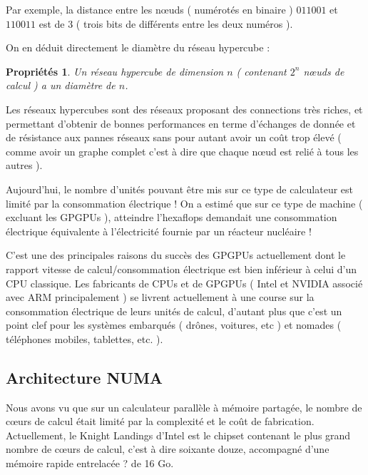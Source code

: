 \documentclass[fleqn,11pt]{article}
\newtheorem{prop}{Propriétés }
\begin{document}
\begin{itemize}
\begin{itemize}
Par exemple, la distance entre les nœuds ( numérotés en binaire ) $011001$ et $110011$ est de 3 ( trois bits
de différents entre les deux numéros ).

On en déduit directement le diamètre du réseau hypercube :

\begin{prop}
Un réseau hypercube de dimension $n$ ( contenant $2^{n}$ nœuds de calcul ) a un diamètre de $n$.
\end{prop}

Les réseaux hypercubes sont des réseaux proposant des connections très riches,
et permettant d'obtenir de bonnes performances en terme d'échanges de donnée
et de résistance aux pannes réseaux sans pour autant avoir un coût trop élevé 
( comme avoir un graphe complet c'est à dire que chaque nœud est relié à tous les autres ).

\end{itemize}



Aujourd'hui, le nombre d'unités pouvant être mis sur ce type de calculateur 
est limité par la consommation électrique !  
On a estimé que sur ce type de machine ( excluant les GPGPUs ), atteindre l'hexaflops demandait une consommation  électrique équivalente à l'électricité fournie par un réacteur nucléaire ! 

C'est une des principales raisons du succès des GPGPUs actuellement dont le rapport vitesse de calcul/consommation électrique est bien inférieur à celui d'un CPU classique. Les fabricants de CPUs et de GPGPUs ( Intel et NVIDIA associé avec ARM principalement ) se livrent 
actuellement à une course sur la consommation électrique de leurs unités de calcul, d'autant plus que c'est un point clef pour les systèmes embarqués  
( drônes, voitures, etc ) et nomades ( téléphones mobiles, tablettes, etc. ).

\end{itemize}

\subsection{Architecture NUMA}

Nous avons vu que sur un calculateur parallèle à mémoire partagée,  le nombre de cœurs de calcul était limité par la complexité et le coût de fabrication. 
Actuellement, le Knight Landings d'Intel est le chipset contenant le plus grand nombre de cœurs de calcul, c'est à dire soixante douze, 
accompagné d'une mémoire rapide entrelacée ? de 16 Go.
\end{document}
